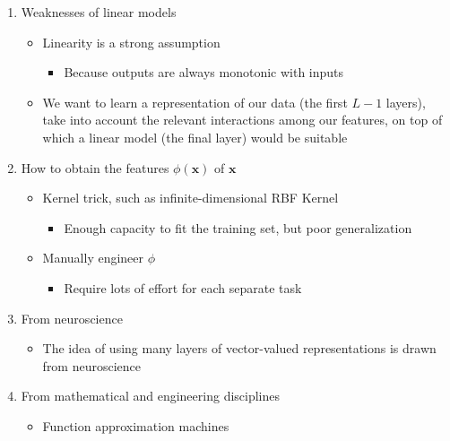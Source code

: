 \documentclass[12pt, a4paper]{article}
\def\vx{\boldsymbol{x}}
\begin{document}
    \begin{enumerate}
        \item Weaknesses of linear models
            \begin{itemize}
                \item Linearity is a strong assumption
                    \begin{itemize}
                        \item Because outputs are always monotonic with inputs
                    \end{itemize}
                \item We want to learn a representation of our data (the first $L-1$ layers), take into account the relevant interactions among our features, on top of which a linear model (the final layer) would be suitable
            \end{itemize}
        \item How to obtain the features $\phi(\vx)$ of $\vx$
            \begin{itemize}
                \item Kernel trick, such as infinite-dimensional RBF Kernel
                    \begin{itemize}
                        \item Enough capacity to fit the training set, but poor generalization
                    \end{itemize}
                \item Manually engineer $\phi$
                    \begin{itemize}
                        \item Require lots of effort for each separate task
                    \end{itemize}
            \end{itemize}
        \item From neuroscience
            \begin{itemize}
                \item The idea of using many layers of vector-valued representations is drawn from neuroscience
            \end{itemize}
        \item From mathematical and engineering disciplines
            \begin{itemize}
                \item Function approximation machines
            \end{itemize}
    \end{enumerate}
\end{document}
